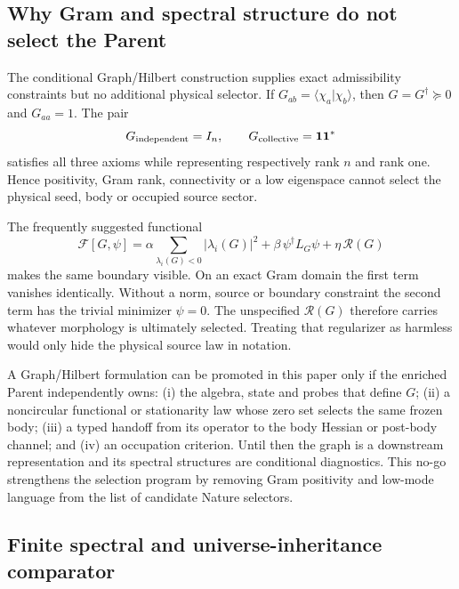 \documentclass[11pt]{article}
\begin{document}
\subsection{Why Gram and spectral structure do not select the Parent}

The conditional Graph/Hilbert construction supplies exact admissibility
constraints but no additional physical selector.  If
$G_{ab}=\langle\chi_a|\chi_b\rangle$, then
$G=G^\dagger\succeq0$ and $G_{aa}=1$.  The pair
\begin{equation}
 G_{\rm independent}=I_n,
 \qquad
 G_{\rm collective}=\mathbf1\mathbf1^*
 \label{eq:paperIV-gram-counterpair}
\end{equation}
satisfies all three axioms while representing respectively rank $n$ and rank
one.  Hence positivity, Gram rank, connectivity or a low eigenspace cannot
select the physical seed, body or occupied source sector.

The frequently suggested functional
\begin{equation}
 \mathcal F[G,\psi]
 =\alpha\sum_{\lambda_i(G)<0}|\lambda_i(G)|^2
 +\beta\,\psi^\dagger L_G\psi+\eta\,\mathcal R(G)
 \label{eq:paperIV-candidate-graph-functional}
\end{equation}
makes the same boundary visible.  On an exact Gram domain the first term
vanishes identically.  Without a norm, source or boundary constraint the
second term has the trivial minimizer $\psi=0$.  The unspecified
$\mathcal R(G)$ therefore carries whatever morphology is ultimately
selected.  Treating that regularizer as harmless would only hide the physical
source law in notation.

A Graph/Hilbert formulation can be promoted in this paper only if the
enriched Parent independently owns: (i) the algebra, state and probes that
define $G$; (ii) a noncircular functional or stationarity law whose zero set
selects the same frozen body; (iii) a typed handoff from its operator to the
body Hessian or post-body channel; and (iv) an occupation criterion.  Until
then the graph is a downstream representation and its spectral structures
are conditional diagnostics.  This no-go strengthens the selection program
by removing Gram positivity and low-mode language from the list of candidate
Nature selectors.

\subsection{Finite spectral and universe-inheritance comparator}
\end{document}
